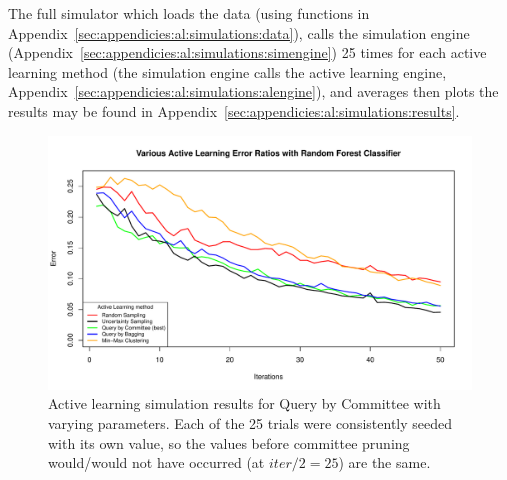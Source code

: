 The full simulator which loads the data (using functions in 
Appendix~\ref{sec:appendicies:al:simulations:data}), calls the simulation 
engine (Appendix~\ref{sec:appendicies:al:simulations:simengine}) 25 times for 
each active learning method (the simulation engine calls the active learning 
engine, Appendix~\ref{sec:appendicies:al:simulations:alengine}), and averages 
then plots the results may be found in 
Appendix~\ref{sec:appendicies:al:simulations:results}.

\begin{figure}[htb]
	\begin{center}
		\includegraphics[width=1\linewidth,page=2]{ch-al/figures/results.pdf}
		\caption[Active learning simulation results for Query by Committee with 
		varying parameters.]{Active learning simulation results for Query by 
			Committee with varying parameters. Each of the 25 trials were 
			consistently seeded with its own value, so the values before 
			committee pruning would/would not have occurred (at $iter/2=25$) 
			are the same. }
		\label{fig:al:simulations:resultsqbc}
	\end{center}
\end{figure}

